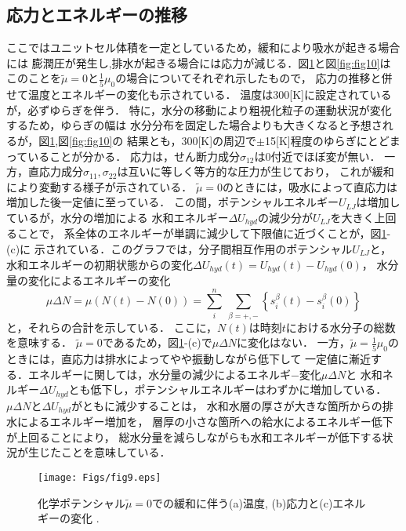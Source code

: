 \subsection{応力とエネルギーの推移}
ここではユニットセル体積を一定としているため，緩和により吸水が起きる場合には
膨潤圧が発生し,排水が起きる場合には応力が減じる．図\ref{fig:fig9}と図\ref{fig:fig10}は
このことを$\tilde \mu=0$と$\frac{1}{5}\mu_0$の場合についてそれぞれ示したもので，
応力の推移と併せて温度とエネルギーの変化も示されている．
温度は300[K]に設定されているが，必ずゆらぎを伴う．
特に，水分の移動により粗視化粒子の運動状況が変化するため，ゆらぎの幅は
水分分布を固定した場合よりも大きくなると予想されるが，図\ref{fig:fig9},図\ref{fig:fig10}の
結果とも，300[K]の周辺で$\pm$15[K]程度のゆらぎにとどまっていることが分かる．
応力は，せん断力成分$\sigma_{12}$は0付近でほぼ変が無い．
一方，直応力成分$\sigma_{11},\sigma_{22}$は互いに等しく等方的な圧力が生じており，
これが緩和により変動する様子が示されている．
$\tilde \mu=0$のときには，吸水によって直応力は増加した後一定値に至っている．
この間，ポテンシャルエネルギー$U_{LJ}$は増加しているが，水分の増加による
水和エネルギー$\Delta U_{hyd}$の減少分が$U_{LJ}$を大きく上回ることで，
系全体のエネルギーが単調に減少して下限値に近づくことが，図\ref{fig:fig9}-(c)に
示されている．このグラフでは，分子間相互作用のポテンシャル$U_{LJ}$と，
水和エネルギーの初期状態からの変化$\Delta U_{hyd}(t)=U_{hyd}(t)-U_{hyd}(0)$，
水分量の変化によるエネルギーの変化
\begin{equation}
	\mu \Delta N= \mu \left(N(t)-N(0) \right) 
	= \sum_i^n\ \sum_{\beta=+,-}\left\{ s_i^\beta(t)-s_i^\beta(0) \right\}
	\label{eqn:mu_dN}
\end{equation}
と，それらの合計を示している．
ここに，$N(t)$は時刻$t$における水分子の総数を意味する．
$\tilde \mu=0$であるため，図\ref{fig:fig9}-(c)で$\mu \Delta N$に変化はない．
%
一方，$\tilde \mu =\frac{1}{5}\mu_0$のときには，直応力は排水によってやや振動しながら低下して
一定値に漸近する．エネルギーに関しては，水分量の減少によるエネルギ−変化$\mu \Delta N$と
水和ネルギー$\Delta U_{hyd}$とも低下し，ポテンシャルエネルギーはわずかに増加している．
$\mu \Delta N$と$\Delta U_{hyd}$がともに減少することは，
水和水層の厚さが大きな箇所からの排水によるエネルギー増加を，
層厚の小さな箇所への給水によるエネルギー低下が上回ることにより，
総水分量を減らしながらも水和エネルギーが低下する状況が生じたことを意味している．
\begin{figure}[h]
	\begin{center}
	\texttt{[image: Figs/fig9.eps]} 
	\end{center}
	\caption{
		化学ポテンシャル$\tilde \mu=0$での緩和に伴う(a)温度, (b)応力と(c)エネルギーの変化 .
	} 
	\label{fig:fig9}
\end{figure}
